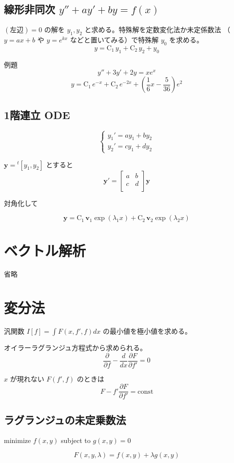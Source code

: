 \documentclass[a4paper]{ltjsarticle}
\begin{document}
\subsection{線形非同次 \quad $ y'' + ay' + by = f(x) $}

$ (左辺) = 0 $ の解を $ y_1, y_2 $ と求める。特殊解を定数変化法か未定係数法
（ $ y = ax + b $ や $ y = e^{kx} $ などと置いてみる）で特殊解 $y_0$ を求める。
$$ y = \mathrm{C}_1 \, y_1 + \mathrm{C}_2 \, y_2 + y_0 $$

例題
$$ y'' + 3y' + 2y = xe^x $$
$$ y = \mathrm{C}_1 \, e^{-x} + \mathrm{C}_2 \, e^{-2x} + \left( \frac{1}{6}x - \frac{5}{36} \right) e^2 $$



\subsection{1階連立 ODE}
$$ \begin{cases}
    y_1' = ay_1 + by_2 \\
    y_2' = cy_1 + dy_2
\end{cases} $$

$ \mathbf{y} = {^t}[y_1, y_2] $ とすると
$$ \mathbf{y}' = \begin{bmatrix} a & b \\ c & d \\ \end{bmatrix} \mathbf{y} $$

対角化して

$$ \mathbf{y} = \mathrm{C}_1 \, \mathbf{v}_1 \exp(\lambda_1 x) + \mathrm{C}_2 \, \mathbf{v}_2 \exp(\lambda_2 x) $$



\section{ベクトル解析}

省略

\section{変分法}

汎関数 $ I[f] = \int F(x, f', f) dx $ の最小値を極小値を求める。

オイラーラグランジュ方程式から求められる。
$$ \frac{\partial}{\partial f} - \frac{d}{dx}\frac{\partial F}{\partial f'} = 0 $$

$x$ が現れない $ F(f', f) $ のときは
$$ F - f' \frac{\partial F}{\partial f'} = \mathrm{const} $$

\subsection{ラグランジュの未定乗数法}

minimize $ f(x, y) $ subject to $ g(x, y) = 0 $

$$ F(x,  y, \lambda) = f(x, y) + \lambda g(x, y) $$

\end{document}
